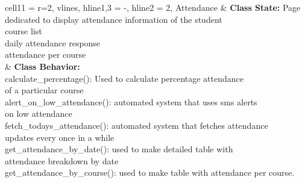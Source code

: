 \documentclass[11pt]{article}
\begin{document}
\begin{longtblr}[
  label = none,
  entry = none,
]{
  cell{1}{1} = {r=2}{},
  vlines,
  hline{1,3} = {-}{},
  hline{2} = {2}{},
}
Attendance & {\textbf{Class State:} Page dedicated to display attendance information of the student\\
\hspace{\dimexpr\labelsep+0.5\tabcolsep}course list\\
\hspace{\dimexpr\labelsep+0.5\tabcolsep}daily attendance response\\
\hspace{\dimexpr\labelsep+0.5\tabcolsep}attendance per course}\\
           & {\textbf{Class Behavior:}\\
\hspace{\dimexpr\labelsep+0.5\tabcolsep}calculate\_percentage(): Used to calculate percentage attendance \\
of a particular course\\
\hspace{\dimexpr\labelsep+0.5\tabcolsep}alert\_on\_low\_attendance(): automated system that uses sms
alerts \\on low attendance\\
\hspace{\dimexpr\labelsep+0.5\tabcolsep}fetch\_todays\_attendance(): automated system that fetches attendance\\
 updates every once in a while\\
\hspace{\dimexpr\labelsep+0.5\tabcolsep}get\_attendance\_by\_date(): used to make detailed table with \\
attendance breakdown by date\\
\hspace{\dimexpr\labelsep+0.5\tabcolsep}get\_attendance\_by\_course(): used to make table with attendance per course.}
\end{longtblr}

\pagebreak
\end{document}
